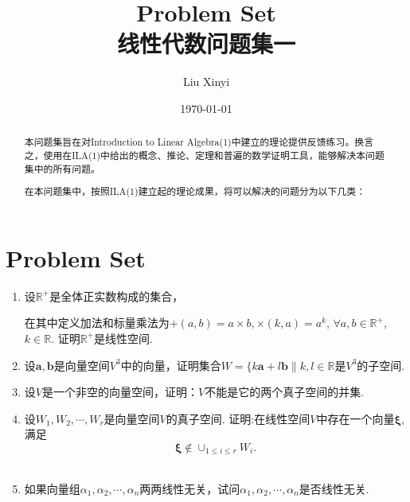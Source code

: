 \documentclass{ctexart}
\title{Problem Set\\线性代数问题集一}
\author{Liu Xinyi}
\date{\today}
\begin{document}
\maketitle
\begin{abstract}
    本问题集旨在对Introduction to Linear Algebra(1)中建立的理论提供反馈练习。换言之，使用在ILA(1)中给出的概念、推论、定理和普遍的数学证明工具，能够解决本问题集中的所有问题。

    在本问题集中，按照ILA(1)建立起的理论成果，将可以解决的问题分为以下几类：

    
\end{abstract}
\newpage

\section{Problem Set}
\begin{enumerate}
   \item 设$\mathbb{R}^+$是全体正实数构成的集合，
   
   在其中定义加法和标量乘法为$+(a,b)=a\times b,\times(k,a)=a^k$,
   $\forall a,b \in \mathbb{R}^+$,$k\in \mathbb{R}$. 证明$\mathbb{R}^+$是线性空间.\\

   \vspace*{80pt}
    
   \item 设$\mathbf{a,b}$是向量空间$V^3$中的向量，证明集合$W=\{k\mathbf{a}+l\mathbf{b}\|k,l \in \mathbb{R}$是$V^3$的子空间.\\
   
   \vspace*{80pt}
    
   \item 设$V$是一个非空的向量空间，证明：$V$不能是它的两个真子空间的并集.\\
   
   \vspace*{80pt}
    
   \item 设$W_1,W_2,\cdots,W_r$是向量空间$V$的真子空间. 证明:在线性空间$V$中存在一个向量$\mathbf{\xi}$,满足
    $$
    \mathbf{\xi}\notin \cup_{1\leq i \leq r}W_i.
    $$\\

    \newpage

    \item 如果向量组$\alpha_1,\alpha_2,\cdots,\alpha_n$两两线性无关，试问$\alpha_1,\alpha_2,\cdots,\alpha_n$是否线性无关.\\
    

\end{enumerate}
\end{document}
